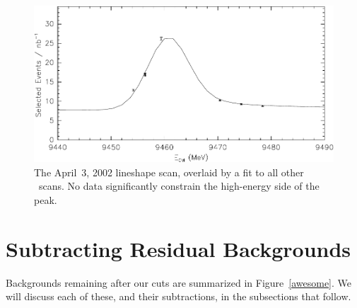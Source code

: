 \documentclass{cornell}
\begin{document}
\begin{figure}[t]
  \begin{center}
    \includegraphics[width=0.8\linewidth]{plots/apr03scan}
  \end{center}
  \caption{\label{apr03scan} The April~3, 2002 lineshape scan,
  overlaid by a fit to all other \us\ scans.  No data significantly
  constrain the high-energy side of the peak.}
\end{figure}

\section{Subtracting Residual Backgrounds}

Backgrounds remaining after our cuts are summarized in Figure~\ref{awesome}.  We will discuss each of these, and their subtractions,
in the subsections that follow.
\end{document}
